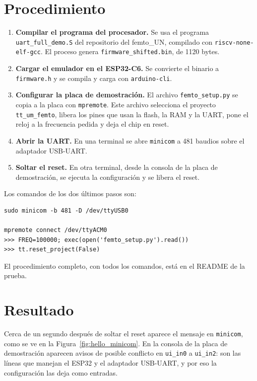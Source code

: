 \documentclass[11pt,letterpaper,oneside]{report}
\newcommand{\code}[1]{\texttt{#1}}
\begin{document}
\section{Procedimiento}

\begin{enumerate}
  \item \textbf{Compilar el programa del procesador.} Se usa el programa \code{uart\_full\_demo.S} del repositorio del femto\_UN, compilado con \code{riscv-none-elf-gcc}. El proceso genera \code{firmware\_shifted.bin}, de 1120 bytes.
  \item \textbf{Cargar el emulador en el ESP32-C6.} Se convierte el binario a \code{firmware.h} y se compila y carga con \code{arduino-cli}.
  \item \textbf{Configurar la placa de demostración.} El archivo \code{femto\_setup.py} se copia a la placa con \code{mpremote}. Este archivo selecciona el proyecto \code{tt\_um\_femto}, libera los pines que usan la flash, la RAM y la UART, pone el reloj a la frecuencia pedida y deja el chip en reset.
  \item \textbf{Abrir la UART.} En una terminal se abre \code{minicom} a 481 baudios sobre el adaptador USB-UART.
  \item \textbf{Soltar el reset.} En otra terminal, desde la consola de la placa de demostración, se ejecuta la configuración y se libera el reset.
\end{enumerate}

Los comandos de los dos últimos pasos son:

\begin{lstlisting}
sudo minicom -b 481 -D /dev/ttyUSB0

mpremote connect /dev/ttyACM0
>>> FREQ=100000; exec(open('femto_setup.py').read())
>>> tt.reset_project(False)
\end{lstlisting}

El procedimiento completo, con todos los comandos, está en el README de la prueba.

\section{Resultado}

Cerca de un segundo después de soltar el reset aparece el mensaje en \code{minicom}, como se ve en la Figura~\ref{fig:hello_minicom}. En la consola de la placa de demostración aparecen avisos de posible conflicto en \code{ui\_in0} a \code{ui\_in2}: son las líneas que manejan el ESP32 y el adaptador USB-UART, y por eso la configuración las deja como entradas.
\end{document}

